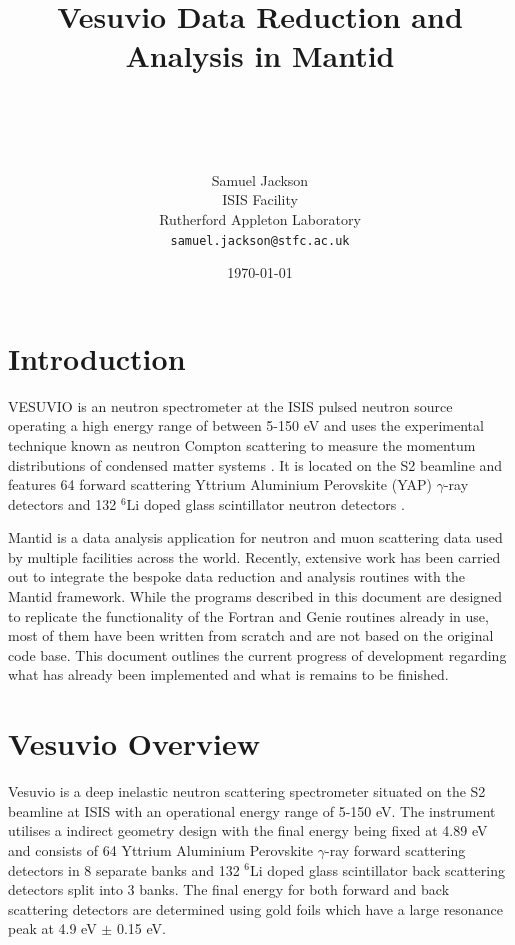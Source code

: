 \documentclass[paper=a4, fontsize=11pt]{scrartcl}	%
\title{ \vspace{-1in} 	\usefont{OT1}{bch}{b}{n}
		\huge \strut Vesuvio Data Reduction and Analysis in Mantid \strut \\
}
\author{ 									\usefont{OT1}{bch}{m}{n}
        Samuel Jackson\\		\usefont{OT1}{bch}{m}{n}
        ISIS Facility\\	\usefont{OT1}{bch}{m}{n}
        Rutherford Appleton Laboratory\\
        \texttt{samuel.jackson@stfc.ac.uk}
}
\date{\today}
\numberwithin{equation}{section}															%
\numberwithin{figure}{section}																%
\numberwithin{table}{section}
\begin{document}
\maketitle
\clearpage
\tableofcontents
\clearpage
\section{Introduction}
\label{sec:introduction}
VESUVIO is an neutron spectrometer at the ISIS pulsed neutron source operating a high energy range of between 5-150 eV and uses the experimental technique known as neutron Compton scattering to measure the momentum distributions of condensed matter systems \citep{mayers2012vesuvio}. It is located on the S2 beamline and features 64 forward scattering Yttrium Aluminium Perovskite (YAP) $\gamma$-ray detectors and 132 $^{6}$Li doped glass scintillator neutron detectors \citep{mayers2011calibration}.

Mantid \citep{mantid} is a data analysis application for neutron and muon scattering data used by multiple facilities across the world. Recently, extensive work has been carried out to integrate the bespoke data reduction and analysis routines with the Mantid framework. While the programs described in this document are designed to replicate the functionality of the Fortran and Genie routines already in use, most of them have been written from scratch and are not based on the original code base. This document outlines the current progress of development regarding what has already been implemented and what is remains to be finished.

\section{Vesuvio Overview}
Vesuvio is a deep inelastic neutron scattering spectrometer situated on the S2 beamline at ISIS with an operational energy range of 5-150 eV. The instrument utilises a indirect geometry design with the final energy being fixed at 4.89 eV \cite{mayers2011calibration} and consists of 64 Yttrium Aluminium Perovskite $\gamma$-ray forward scattering detectors in 8 separate banks and 132 $^6$Li doped glass scintillator back scattering detectors split into 3 banks. The final energy for both forward and back scattering detectors are determined using gold foils which have a large resonance peak at 4.9 eV $\pm$ 0.15 eV. 
\end{document}
